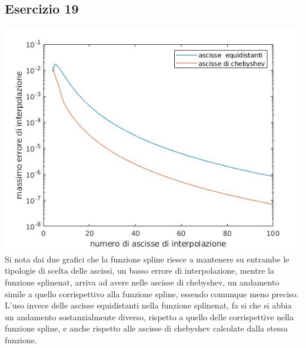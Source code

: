 \subsection{Esercizio 19}
\includegraphics[scale=0.6]{./capitolo4/es19.jpg}\\
Si nota dai due grafici che la funzione spline riesce a mantenere su entrambe le tipologie di scelta delle ascissi, un basso errore di interpolazione, mentre la funzione splinenat, arriva ad avere nelle ascisse di chebyshev, un andamento simile a quello corrispettivo alla funzione spline, essendo comunque meno preciso. L'uso invece delle ascisse equidistanti nella funzione splinenat, fa si che si abbia un andamento sostanzialmente diverso, rispetto a quello delle corrispettive nella funzione spline, e anche rispetto alle ascisse di chebyshev calcolate dalla stessa funzione.

